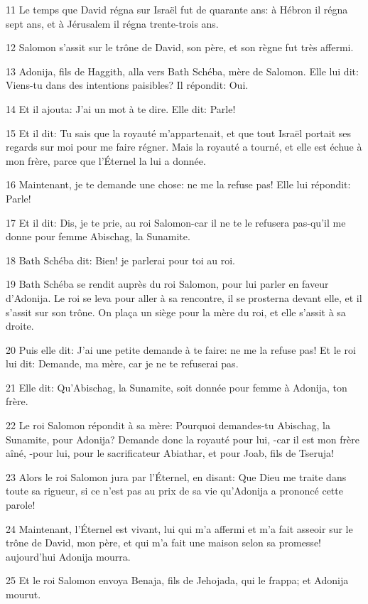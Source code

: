 \par 11 Le temps que David régna sur Israël fut de quarante ans: à Hébron il régna sept ans, et à Jérusalem il régna trente-trois ans.
\par 12 Salomon s'assit sur le trône de David, son père, et son règne fut très affermi.
\par 13 Adonija, fils de Haggith, alla vers Bath Schéba, mère de Salomon. Elle lui dit: Viens-tu dans des intentions paisibles? Il répondit: Oui.
\par 14 Et il ajouta: J'ai un mot à te dire. Elle dit: Parle!
\par 15 Et il dit: Tu sais que la royauté m'appartenait, et que tout Israël portait ses regards sur moi pour me faire régner. Mais la royauté a tourné, et elle est échue à mon frère, parce que l'Éternel la lui a donnée.
\par 16 Maintenant, je te demande une chose: ne me la refuse pas! Elle lui répondit: Parle!
\par 17 Et il dit: Dis, je te prie, au roi Salomon-car il ne te le refusera pas-qu'il me donne pour femme Abischag, la Sunamite.
\par 18 Bath Schéba dit: Bien! je parlerai pour toi au roi.
\par 19 Bath Schéba se rendit auprès du roi Salomon, pour lui parler en faveur d'Adonija. Le roi se leva pour aller à sa rencontre, il se prosterna devant elle, et il s'assit sur son trône. On plaça un siège pour la mère du roi, et elle s'assit à sa droite.
\par 20 Puis elle dit: J'ai une petite demande à te faire: ne me la refuse pas! Et le roi lui dit: Demande, ma mère, car je ne te refuserai pas.
\par 21 Elle dit: Qu'Abischag, la Sunamite, soit donnée pour femme à Adonija, ton frère.
\par 22 Le roi Salomon répondit à sa mère: Pourquoi demandes-tu Abischag, la Sunamite, pour Adonija? Demande donc la royauté pour lui, -car il est mon frère aîné, -pour lui, pour le sacrificateur Abiathar, et pour Joab, fils de Tseruja!
\par 23 Alors le roi Salomon jura par l'Éternel, en disant: Que Dieu me traite dans toute sa rigueur, si ce n'est pas au prix de sa vie qu'Adonija a prononcé cette parole!
\par 24 Maintenant, l'Éternel est vivant, lui qui m'a affermi et m'a fait asseoir sur le trône de David, mon père, et qui m'a fait une maison selon sa promesse! aujourd'hui Adonija mourra.
\par 25 Et le roi Salomon envoya Benaja, fils de Jehojada, qui le frappa; et Adonija mourut.
